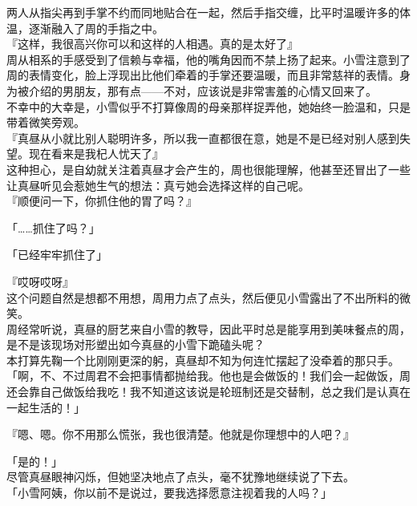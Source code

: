 两人从指尖再到手掌不约而同地贴合在一起，然后手指交缠，比平时温暖许多的体温，逐渐融入了周的手指之中。\\

『这样，我很高兴你可以和这样的人相遇。真的是太好了』\\

周从相系的手感受到了信赖与幸福，他的嘴角因而不禁上扬了起来。小雪注意到了周的表情变化，脸上浮现出比他们牵着的手掌还要温暖，而且非常慈祥的表情。身为被介绍的男朋友，那有点——不对，应该说是非常害羞的心情又回来了。\\

不幸中的大幸是，小雪似乎不打算像周的母亲那样捉弄他，她始终一脸温和，只是带着微笑旁观。\\

『真昼从小就比别人聪明许多，所以我一直都很在意，她是不是已经对别人感到失望。现在看来是我杞人忧天了』\\

这种担心，是自幼就关注着真昼才会产生的，周也很能理解，他甚至还冒出了一些让真昼听见会惹她生气的想法：真亏她会选择这样的自己呢。\\

『顺便问一下，你抓住他的胃了吗？』

「……抓住了吗？」

「已经牢牢抓住了」

『哎呀哎呀』\\

这个问题自然是想都不用想，周用力点了点头，然后便见小雪露出了不出所料的微笑。\\

周经常听说，真昼的厨艺来自小雪的教导，因此平时总是能享用到美味餐点的周，是不是该现场对形塑出如今真昼的小雪下跪磕头呢？\\

本打算先鞠一个比刚刚更深的躬，真昼却不知为何连忙摆起了没牵着的那只手。\\

「啊，不、不过周君不会把事情都抛给我。他也是会做饭的！我们会一起做饭，周还会靠自己做饭给我吃！我不知道这该说是轮班制还是交替制，总之我们是认真在一起生活的！」

『嗯、嗯。你不用那么慌张，我也很清楚。他就是你理想中的人吧？』

「是的！」\\

尽管真昼眼神闪烁，但她坚决地点了点头，毫不犹豫地继续说了下去。\\

「小雪阿姨，你以前不是说过，要我选择愿意注视着我的人吗？」

